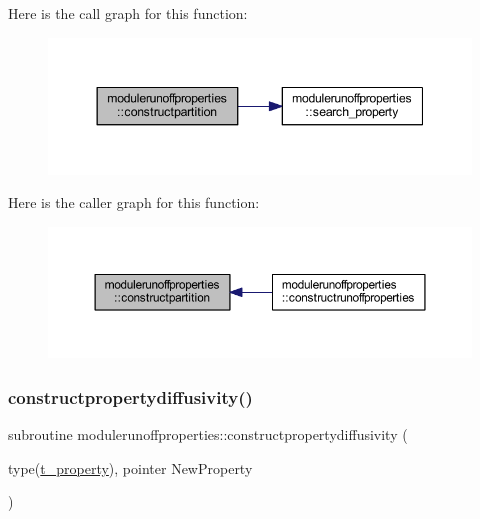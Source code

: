 Here is the call graph for this function\+:\nopagebreak
\begin{figure}[H]
\begin{center}
\leavevmode
\includegraphics[width=344pt]{namespacemodulerunoffproperties_ac7e05edd5458dddb9680976873653eec_cgraph}
\end{center}
\end{figure}
Here is the caller graph for this function\+:\nopagebreak
\begin{figure}[H]
\begin{center}
\leavevmode
\includegraphics[width=350pt]{namespacemodulerunoffproperties_ac7e05edd5458dddb9680976873653eec_icgraph}
\end{center}
\end{figure}
\mbox{\label{namespacemodulerunoffproperties_abe332d8f07a02030f5b0712c32f01262}} 
\subsubsection{\texorpdfstring{constructpropertydiffusivity()}{constructpropertydiffusivity()}}
{\footnotesize\ttfamily subroutine modulerunoffproperties\+::constructpropertydiffusivity (\begin{DoxyParamCaption}\item[{type(\mbox{\hyperlink{structmodulerunoffproperties_1_1t__property}{t\+\_\+property}}), pointer}]{New\+Property }\end{DoxyParamCaption})\hspace{0.3cm}{\ttfamily [private]}}

